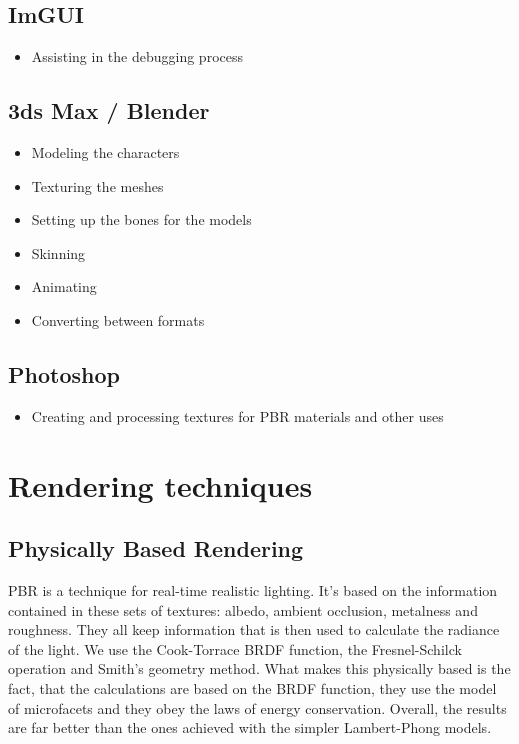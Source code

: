 \documentclass[12pt, english]{article}
\begin{document}
\subsection{ImGUI}
\begin{itemize}
	\item Assisting in the debugging process
\end{itemize}

\subsection{3ds Max / Blender}
\begin{itemize}
	\item Modeling the characters
	\item Texturing the meshes
	\item Setting up the bones for the models
	\item Skinning
	\item Animating
	\item Converting between formats
\end{itemize}

\subsection{Photoshop}
\begin{itemize}
	\item Creating and processing textures for PBR materials and other uses
\end{itemize}

\section{Rendering techniques}
\subsection{Physically Based Rendering}
PBR is a technique for real-time realistic lighting. It's based on the information contained in these sets of textures: albedo, ambient occlusion, metalness and roughness. They all keep information that is then used to calculate the radiance of the light. We use the Cook-Torrace BRDF function, the Fresnel-Schilck operation and Smith's geometry method. What makes this physically based is the fact, that the calculations are based on the BRDF function, they use the model of microfacets and they obey the laws of energy conservation. Overall, the results are far better than the ones achieved with the simpler Lambert-Phong models.
\end{document}

